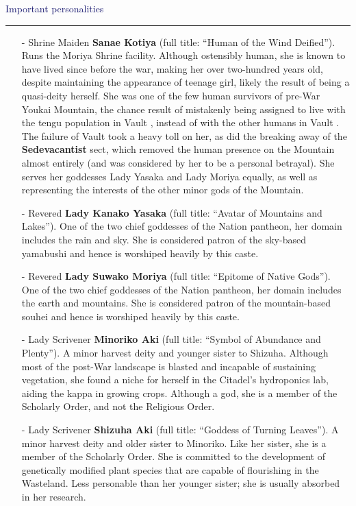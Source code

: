 \documentclass[a4paper,12pt]{book}
\newcommand{\maru}[1]{\raisebox{.5pt}{\textcircled{\raisebox{-.9pt} {#1}}}}
\newcommand{\factionheading}[1]{
\parbox{\textwidth}{
        \vspace{2mm}
        \noindent
        \textcolor{MidnightBlue}{
{\large {#1}
        \vspace*{1mm}
        \hrule}
        \vspace*{3mm}
        \noindent
} } }
\begin{document}
\factionheading{Important personalities}
\begin{itemize}
\item[-] Shrine Maiden \textbf{Sanae Kotiya} (full title: ``Human of the Wind Deified''). Runs the Moriya Shrine facility. Although ostensibly human, she is known to have lived since before the war, making her over two-hundred years old, despite maintaining the appearance of teenage girl, likely the result of being a quasi-deity herself. She was one of the few human survivors of pre-War Youkai Mountain, the chance result of mistakenly being assigned to live with the tengu population in Vault \maru{12}, instead of with the other humans in Vault \maru{13}. The failure of Vault \maru{13} took a heavy toll on her, as did the breaking away of the \textbf{Sedevacantist} sect, which removed the human presence on the Mountain almost entirely (and was considered by her to be a personal betrayal). She serves her goddesses Lady Yasaka and Lady Moriya equally, as well as representing the interests of the other minor gods of the Mountain.
\item[-] Revered \textbf{Lady Kanako Yasaka} (full title: ``Avatar of Mountains and Lakes''). One of the two chief goddesses of the Nation pantheon, her domain includes the rain and sky. She is considered patron of the sky-based yamabushi and hence is worshiped heavily by this caste.
\item[-] Revered \textbf{Lady Suwako Moriya} (full title: ``Epitome of Native Gods''). One of the two chief goddesses of the Nation pantheon, her domain includes the earth and mountains. She is considered patron of the mountain-based souhei and hence is worshiped heavily by this caste.
\item[-] Lady Scrivener \textbf{Minoriko Aki} (full title: ``Symbol of Abundance and Plenty''). A minor harvest deity and younger sister to Shizuha. Although most of the post-War landscape is blasted and incapable of sustaining vegetation, she found a niche for herself in the Citadel’s hydroponics lab, aiding the kappa in growing crops. Although a god, she is a member of the Scholarly Order, and not the Religious Order.
\item[-] Lady Scrivener \textbf{Shizuha Aki} (full title: ``Goddess of Turning Leaves''). A minor harvest deity and older sister to Minoriko. Like her sister, she is a member of the Scholarly Order. She is committed to the development of genetically modified plant species that are capable of flourishing in the Wasteland. Less personable than her younger sister; she is usually absorbed in her research.

\end{itemize}
\end{document}
